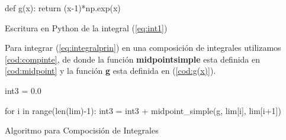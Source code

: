 \documentclass[../portafolio.tex]{subfiles}
\begin{document}
\begin{listing}
	\begin{pythoncode}
def g(x):
    return (x-1)*np.exp(x)
	\end{pythoncode}
	\caption{Escritura en Python de la integral (\ref{eq:int1})}
	\label{cod:g(x)}
\end{listing}

Para integrar (\ref{eq:integralprin}) en una composici\'on de integrales utilizamos \ref{cod:compinte}, de donde la funci\'on \textbf{midpointsimple} esta definida en \ref{cod:midpoint} y la funci\'on \textbf{g} esta definida en (\ref{cod:g(x)}).

\begin{listing}
	\begin{pythoncode}
int3 = 0.0

for i in range(len(lim)-1):
    int3 = int3 + midpoint_simple(g, lim[i], lim[i+1])
	\end{pythoncode}
	\caption{Algoritmo para Compocisi\'on de Integrales}
	\label{cod:compinte}
\end{listing}
\end{document}
